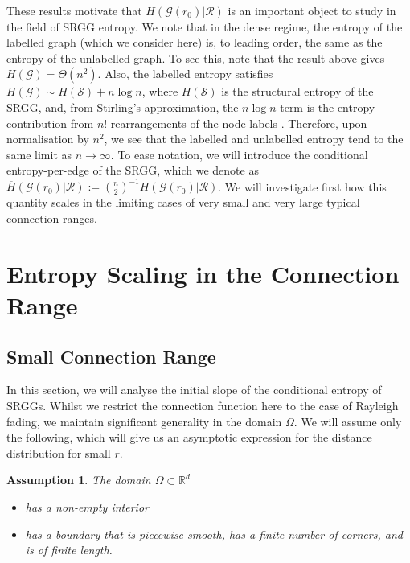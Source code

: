 \documentclass{article}
\newtheorem{assumption}{Assumption}
\newcommand{\tti}{\rightarrow\infty}
\newcommand{\graph}{\mathcal{G}}
\begin{document}
These results motivate that $H(\graph(r_0)|\mathcal{R})$ is an important object to study in the field of SRGG entropy. We note that in the dense regime, the entropy of the labelled graph (which we consider here) is, to leading order, the same as the entropy of the unlabelled graph. To see this, note that the result above gives $H(\graph) = \Theta(n^2)$. Also, the labelled entropy satisfies $H(\graph) \sim H(\mathcal{S}) + n\log n$, where $H(\mathcal{S})$ is the structural entropy of the SRGG, and, from Stirling's approximation, the $n\log n$ term is the entropy contribution from $n!$ rearrangements of the node labels \cite{structural_badiu_2021, paton2022entropy}. Therefore, upon normalisation by $n^2$, we see that the labelled and unlabelled entropy tend to the same limit as $n\tti$. To ease notation, we will introduce the conditional entropy-per-edge of the SRGG, which we denote as $\overline{H}(\graph(r_0)|\mathcal{R}) := \binom{n}{2}^{-1}H(\graph(r_0)|\mathcal{R})$. We will investigate first how this quantity scales in the limiting cases of very small and very large typical connection ranges.


\section{Entropy Scaling in the Connection Range}
\label{sec:scaling}
\subsection{Small Connection Range}
    In this section, we will analyse the initial slope of the conditional entropy of SRGGs. Whilst we restrict the connection function here to the case of Rayleigh fading, we maintain significant generality in the domain $\Omega$. We will assume only the following, which will give us an asymptotic expression for the distance distribution for small $r$.
    \begin{assumption}
        \label{assumption_omega}
        The domain $\Omega \subset \mathbb{R}^d$
        \begin{itemize}
            \item[A1.] has a non-empty interior
            \item[A2.] has a boundary that is piecewise smooth, has a finite number of corners, and is of finite length.
        \end{itemize}
    \end{assumption}
    
\end{document}
